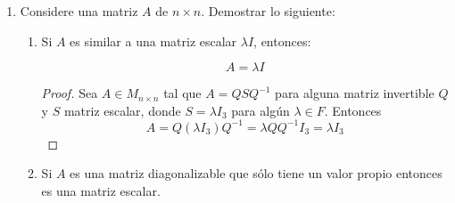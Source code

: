 \documentclass[letterpaper]{article}
\newcommand{\R}{\mathbb{R}}
\newcommand{\Po}{\mathds{P}}
\newtheorem*{sol}{Solución}
\newtheorem*{definition}{Definición}
\begin{document}
\begin{enumerate}
\begin{sol}
Observémos que $\beta = \left\{
    \begin{pmatrix}
        1\\
        0\\
        0
    \end{pmatrix},
    \begin{pmatrix}
        0\\
        1\\
        0
    \end{pmatrix},
    \begin{pmatrix}
        0\\
        0\\
        1
    \end{pmatrix}  \right\}$
es una base de $\Po_2(\R)$ que consiste de vectores propio de $T$. Por tanto $T$ es diagonalizable.
\end{sol}

\begin{definition}
    Una matriz escalar es una matriz cuadrada de la forma $\lambda I$ para algún escalar $\lambda$; o sea, una matriz
    escalar es una matriz diagonal en la cual todos los elementos de la diagonal son iguales.
\end{definition}


\item Considere una matriz $A$ de $n \times n$. Demostrar lo siguiente:

\begin{enumerate}[label=(\alph*)]
    \item Si $A$ es similar a una matriz escalar $\lambda I$, entonces:

    \[
        A = \lambda I
    \]
    
    \begin{proof}
    Sea $A \in M_{n \times n}$ tal que $A = QSQ^{-1}$ para alguna matriz invertible $Q$ y $S$ matriz escalar, donde
    $S = \lambda I_3$ para algún $\lambda \in F$. Entonces
    \[
        A = Q(\lambda I_3) Q^{-1} = \lambda Q Q^{-1} I_3 = \lambda I_3
    \]
    \end{proof}

    \item Si $A$ es una matriz diagonalizable que sólo tiene un valor propio entonces es una matriz escalar.
    

\end{enumerate}
\end{enumerate}
\end{document}
